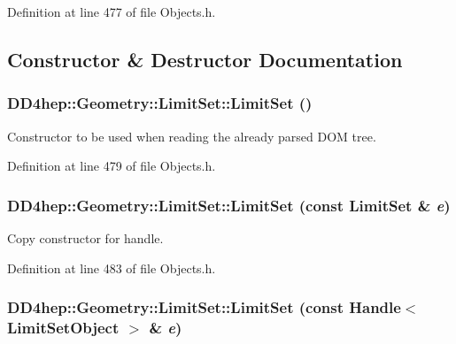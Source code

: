 Definition at line 477 of file Objects.h.

\subsection{Constructor \& Destructor Documentation}
\hypertarget{class_d_d4hep_1_1_geometry_1_1_limit_set_a44077ffb973e104ce5175a1695b2d450}{
\subsubsection[{LimitSet}]{\setlength{\rightskip}{0pt plus 5cm}DD4hep::Geometry::LimitSet::LimitSet ()}}
\label{class_d_d4hep_1_1_geometry_1_1_limit_set_a44077ffb973e104ce5175a1695b2d450}


Constructor to be used when reading the already parsed DOM tree. 

Definition at line 479 of file Objects.h.\hypertarget{class_d_d4hep_1_1_geometry_1_1_limit_set_a886be632405e18f3e90cbb0d886f2975}{
\subsubsection[{LimitSet}]{\setlength{\rightskip}{0pt plus 5cm}DD4hep::Geometry::LimitSet::LimitSet (const {\bf LimitSet} \& {\em e})}}
\label{class_d_d4hep_1_1_geometry_1_1_limit_set_a886be632405e18f3e90cbb0d886f2975}


Copy constructor for handle. 

Definition at line 483 of file Objects.h.\hypertarget{class_d_d4hep_1_1_geometry_1_1_limit_set_a53b9f8c03c205b3a628c03bf6592689a}{
\subsubsection[{LimitSet}]{\setlength{\rightskip}{0pt plus 5cm}DD4hep::Geometry::LimitSet::LimitSet (const {\bf Handle}$<$ {\bf LimitSetObject} $>$ \& {\em e})}}
\label{class_d_d4hep_1_1_geometry_1_1_limit_set_a53b9f8c03c205b3a628c03bf6592689a}


